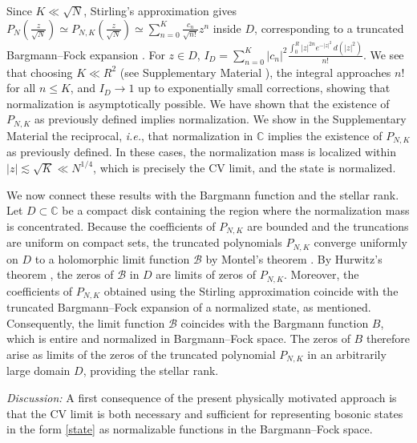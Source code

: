 \documentclass[aps,prl,showpacs,twocolumn]{revtex4-2}
\begin{document}
Since $K \ll \sqrt{N}$, Stirling’s approximation gives $P_N\!\left(\frac{z}{\sqrt{N}}\right ) \simeq  P_{N,K}\!\left(\frac{z}{\sqrt{N}}\right) \simeq \sum_{n=0}^K \frac{c_n}{\sqrt{n!}} z^n$ inside $D$, corresponding to a truncated Bargmann–Fock expansion \cite{Bargmann1961, Segal1963Relativistic}. For $z\in D$, $I_D = \sum_{n=0}^K |c_n|^2 \frac{\int_0^R |z|^{2n} e^{-|z|^2}\,d(|z|^2)}{n!}$. We see that choosing $K \ll R^2$ (see Supplementary Material \cite{SM}), the integral approaches $n!$ for all $n \le K$, and $I_D \to 1$ up to exponentially small corrections, showing that normalization is asymptotically possible. We have shown that the existence of $P_{N,K}$ as previously defined implies normalization. We show in the Supplementary Material \cite{SM} the reciprocal, {\it i.e.}, that normalization in $\mathbb{C}$ implies the existence of $P_{N,K}$ as previously defined. In these cases, the normalization mass is localized within $|z|\lesssim \sqrt{K} \ll N^{1/4}$, which is precisely the CV limit, and the state is normalized.


We now connect these results with the Bargmann function and the stellar rank. Let $D\subset\mathbb{C}$ be a compact disk containing the region where the normalization mass is concentrated. Because the coefficients of $P_{N,K}$ are bounded and the truncations are uniform on compact sets, the truncated polynomials $P_{N,K}$ converge uniformly on $D$ to a holomorphic limit function $\mathcal{B}$ by Montel's theorem \cite{Conway}. By Hurwitz’s theorem  \cite{Conway}, the zeros of $\mathcal{B}$ in $D$ are limits of zeros of $P_{N,K}$. Moreover, the coefficients of $P_{N,K}$ obtained using the Stirling approximation coincide with the truncated Bargmann–Fock expansion of a normalized state, as mentioned. Consequently, the limit function $\mathcal{B}$ coincides with the Bargmann function $B$, which is entire and normalized in Bargmann–Fock space. The zeros of $B$ therefore arise as limits of the zeros of the truncated polynomial $P_{N,K}$ in an arbitrarily large domain $D$, providing the stellar rank.







{\it Discussion:} A first consequence of the present physically motivated approach is that the CV limit is both necessary and sufficient for representing bosonic states in the form \eqref{state} as normalizable functions in the Bargmann–Fock space.
\end{document}

